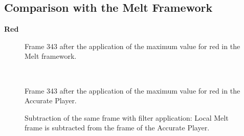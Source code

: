 \documentclass[../MasterThesis.tex]{subfiles}
\begin{document}
\vspace*{-0.4em}

\subsection*{Comparison with the Melt Framework}

\vspace*{-0.4em}


\textbf{Red}

\vspace*{-1.4em}

\begin{minipage}{0.48\textwidth}
	
	\begin{figure}[H]
		\begin{center}
			\caption[]{\small Frame 343 after the application of the maximum value for red in the Melt framework.}
		\end{center}
	\end{figure}
\end{minipage}\begin{minipage}{0.04\textwidth}
	\ 
\end{minipage}\begin{minipage}{0.48\textwidth}
	
	\begin{figure}[H]
		\begin{center}
			\caption[]{\small Frame 343 after the application of the maximum value for red in the Accurate Player.}
		\end{center}
	\end{figure}
\end{minipage}

\vspace*{-1em}

\begin{figure}[H]
	\begin{center}
		\caption[]{\small Subtraction of the same frame with filter application: Local Melt frame is subtracted from the frame of the Accurate Player.}
	\end{center}
\end{figure}
\end{document}
